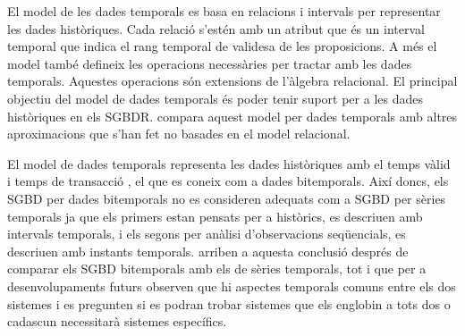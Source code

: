 El model de les dades
temporals \parencite{date02:_tempor_data_relat_model} es basa en
relacions i intervals per representar les dades històriques. Cada
relació s'estén amb un atribut que és un interval temporal que indica
el rang temporal de validesa de les proposicions. A més el model també
defineix les operacions necessàries per tractar amb les dades
temporals. Aquestes operacions són extensions de l'àlgebra relacional.
El principal objectiu del model de dades temporals és poder tenir
suport per a les dades històriques en els SGBDR.
\textcite[cap.~28]{date06} compara aquest model per dades temporals
amb altres aproximacions que s'han fet no basades en el model
relacional.



El model de dades temporals representa les dades històriques amb el
temps vàlid i temps de
transacció \parencite[cap.~15]{date02:_tempor_data_relat_model}, el
que es coneix com a dades bitemporals.  Així doncs, els SGBD per dades
bitemporals no es consideren adequats com a SGBD per sèries temporals
ja que els primers estan pensats per a històrics, es descriuen amb
intervals temporals, i els segons per anàlisi d'observacions
seqüencials, es descriuen amb instants temporals.
\textcite{schmidt95} arriben a aquesta conclusió després de comparar
els SGBD bitemporals amb els de sèries temporals, tot i que per a
desenvolupaments futurs observen que hi aspectes temporals comuns
entre els dos sistemes i es pregunten si es podran trobar sistemes que
els englobin a tots dos o cadascun necessitarà sistemes específics.






















